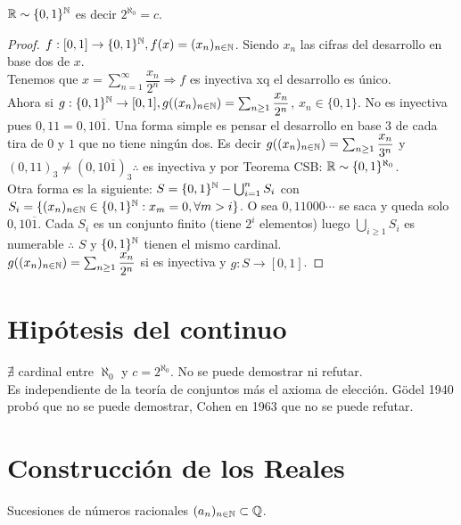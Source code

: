 \begin{theorem}
  $\mathbb{R} \sim \{ 0, 1 \}^{\mathbb{N}}$ es decir $2^{\aleph_0} = c$.
  \begin{proof}
    $f: [0, 1] \to \{ 0, 1 \}^{\mathbb{N}}, f(x) = (x_n)_{n \in \mathbb{N}}$. Siendo $x_n$ las cifras del desarrollo en base dos de $x$. \\
    Tenemos que $x = \sum_{n=1}^\infty \dfrac{x_n}{2^n} \Rightarrow f$ es inyectiva xq el desarrollo es único. \\
    Ahora si $g: \{ 0, 1 \}^{\mathbb{N}} \to [0, 1], g((x_n)_{n \in \mathbb{N}}) = \sum_{n \geq 1} \dfrac{x_n}{2^n}$, $x_n \in \{0, 1\}$. No es inyectiva pues $0,11 = 0,10\overline{1}$.
    Una forma simple es pensar el desarrollo en base $3$ de cada tira de $0$ y $1$ que no tiene ningún dos. Es decir $g((x_n)_{n \in \mathbb{N}}) = \sum_{n \geq 1} \dfrac{x_n}{3^n}$ y $(0,11)_3 \neq (0,10\overline{1})_3 \therefore$
    es inyectiva y por Teorema CSB: $\mathbb{R} \sim \{0,1\}^{\aleph_0}$. \\
    Otra forma es la siguiente:
    $S = \{0, 1\}^{\mathbb{N}} - \bigcup_{i=1}^n S_i$ con $S_i = \{ (x_n)_{n \in \mathbb{N}} \in \{0, 1\}^{\mathbb{N}} : x_m = 0, \forall m > i \}$. O sea $0,11000\cdots$ se saca y queda solo $0,10\overline{1}$.
    Cada $S_i$ es un conjunto finito (tiene $2^i$ elementos) luego $\bigcup_{i \geq 1} S_i$ es numerable $\therefore$ $S$ y $\{0,1\}^{\mathbb{N}}$ tienen el mismo cardinal. \\
    $g((x_n)_{n \in \mathbb{N}}) = \sum_{n \geq 1} \dfrac{x_n}{2^n}$ si es inyectiva y $g: S \to [0, 1]$.
  \end{proof}
\end{theorem}

\section{Hipótesis del continuo}

$\nexists$ cardinal entre $\aleph_0$ y $c = 2^{\aleph_0}$. No se puede demostrar ni refutar. \\
Es independiente de la teoría de conjuntos más el axioma de elección.
Gödel 1940 probó que no se puede demostrar, Cohen en 1963 que no se puede refutar.

\section{Construcción de los Reales}

Sucesiones de números racionales $(a_n)_{n \in \mathbb{N}} \subset \mathbb{Q}$. \\

